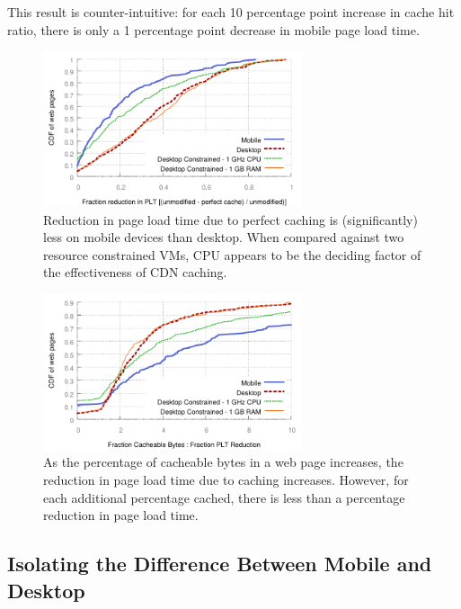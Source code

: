 This result is counter-intuitive: for each 10 percentage point increase in cache hit ratio, there is only a 1 percentage point decrease in mobile page load time.
\begin{figure}[t]
    \includegraphics[width=3in]{../graphs/percent_plt_reduction/percent_reduction_linear.pdf}
    \caption[]{\label{fig:percent_reduction_linear}Reduction in page load time due to perfect caching is (significantly) less on mobile devices than desktop. When compared against two resource constrained VMs, CPU appears to be the deciding factor of the effectiveness of CDN caching.}
\end{figure}

\begin{figure}[t]
    \includegraphics[width=3in]{../graphs/ratio_bytes_to_reduction/ratio_linear_comparison.pdf}
    \caption[]{\label{fig:ratio_linear_comparison}As the percentage of cacheable bytes in a web page increases, the reduction in page load time due to caching increases. However, for each additional percentage cached, there is less than a percentage reduction in page load time.}
\end{figure}
\subsection{Isolating the Difference Between Mobile and Desktop}

